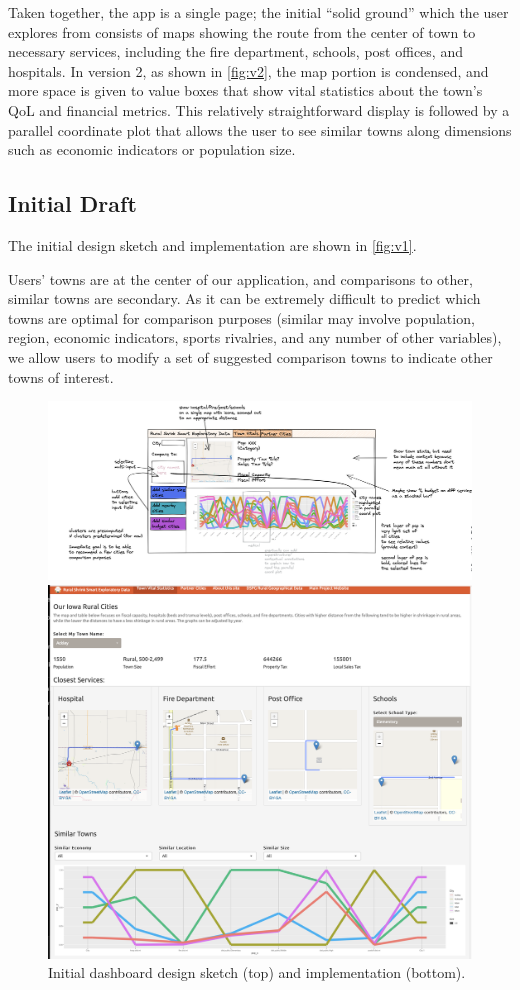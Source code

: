 \documentclass[print]{nuthesis}
\begin{document}
Taken together, the app is a single page; the initial ``solid ground'' which the user explores from consists of maps showing the route from the center of town to necessary services, including the fire department, schools, post offices, and hospitals. In version 2, as shown in \autoref{fig:v2}, the map portion is condensed, and more space is given to value boxes that show vital statistics about the town's QoL and financial metrics. This relatively straightforward display is followed by a parallel coordinate plot that allows the user to see similar towns along dimensions such as economic indicators or population size.

\hypertarget{initial-draft}{%
\subsection{Initial Draft}\label{initial-draft}}

The initial design sketch and implementation are shown in \autoref{fig:v1}.

Users' towns are at the center of our application, and comparisons to other, similar towns are secondary. As it can be extremely difficult to predict which towns are optimal for comparison purposes (similar may involve population, region, economic indicators, sports rivalries, and any number of other variables), we allow users to modify a set of suggested comparison towns to indicate other towns of interest.

\begin{figure}
\centering
\includegraphics[width=\textwidth]{figure/Version1}

\includegraphics[width=.7\textwidth]{figure/Version2}
\caption{Initial dashboard design sketch (top) and implementation (bottom).}\label{fig:v1}
\end{figure}
\end{document}
